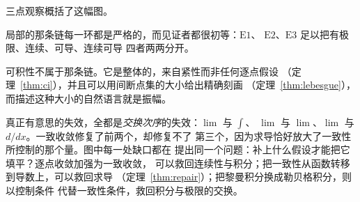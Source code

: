 三点观察概括了这幅图。

局部的那条链每一环都是严格的，而见证者都很初等：$\mathrm{E}1$、
$\mathrm{E}2$、$\mathrm{E}3$ 足以把有极限、连续、可导、连续可导
四者两两分开。

可积性不属于那条链。它是整体的，来自紧性而非任何逐点假设
（定理~\ref{thm:ci}），并且可以用间断点集的大小给出精确刻画
（定理~\ref{thm:lebesgue}），而描述这种大小的自然语言就是振幅。

真正有意思的失效，全都是\emph{交换次序}的失效：$\lim$ 与 $\int$、
$\lim$ 与 $\lim$、$\lim$ 与 $d/dx$。一致收敛修复了前两个，却修复不了
第三个，因为求导恰好放大了一致性所控制的那个量。图中每一处缺口都在
提出同一个问题：补上什么假设才能把它填平？逐点收敛加强为一致收敛，
可以救回连续性与积分；把一致性从函数转移到导数上，可以救回求导
（定理~\ref{thm:repair}）；把黎曼积分换成勒贝格积分，则以控制条件
代替一致性条件，救回积分与极限的交换。
